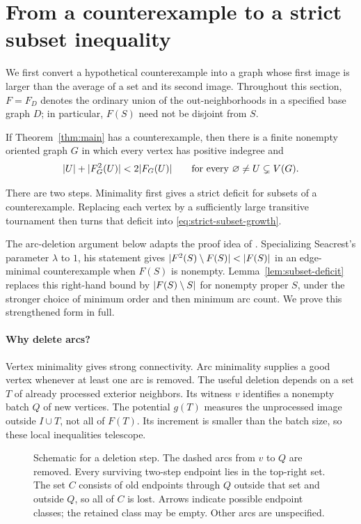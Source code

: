 \section{From a counterexample to a strict subset inequality}
\label{sec:reduction}

We first convert a hypothetical counterexample into a graph whose first
image is larger than the average of a set and its second image.  Throughout
this section, $F=F_D$ denotes the ordinary union of the out-neighborhoods
in a specified base graph $D$; in particular, $F(S)$ need not be disjoint
from $S$.

\begin{proposition}
\label{prop:counterexample-reduction}
If Theorem~\ref{thm:main} has a counterexample, then there is a finite
nonempty oriented graph $G$ in which every vertex has positive indegree
and
\begin{equation}
\label{eq:strict-subset-growth}
  \lvert U\rvert+\lvert F_G^2(U)\rvert<2\lvert F_G(U)\rvert
  \qquad\text{for every }\varnothing\ne U\subsetneq V(G).
\end{equation}
\end{proposition}

There are two steps.  Minimality first gives a strict deficit for subsets
of a counterexample.  Replacing each vertex by a sufficiently large
transitive tournament then turns that deficit into
\eqref{eq:strict-subset-growth}.

The arc-deletion argument below adapts the proof idea of
\cite[Lemma~4]{Seacrest2019}.  Specializing Seacrest's parameter $\lambda$
to $1$, his statement gives
$\lvert F^2(S)\setminus F(S)\rvert<\lvert F(S)\rvert$ in an edge-minimal
counterexample when $F(S)$ is nonempty.  Lemma~\ref{lem:subset-deficit}
replaces this right-hand bound by $\lvert F(S)\setminus S\rvert$ for nonempty
proper $S$, under the stronger choice of minimum order and then minimum
arc count.  We prove this strengthened form in full.


\paragraph{Why delete arcs?}
Vertex minimality gives strong connectivity. Arc minimality supplies a good
vertex whenever at least one arc is removed. The useful deletion depends on
a set $T$ of already processed exterior neighbors. Its witness $v$ identifies
a nonempty batch $Q$ of new vertices. The potential $g(T)$ measures the
unprocessed image outside $I\cup T$, not all of $F(T)$. Its increment is
smaller than the batch size, so these local inequalities telescope.
\begin{figure}[ht]\centering
\caption{Schematic for a deletion step. The dashed arcs from $v$ to $Q$ are removed. Every surviving two-step endpoint lies in the top-right set. The set $C$ consists of old endpoints through $Q$ outside that set and outside $Q$, so all of $C$ is lost. Arrows indicate possible endpoint classes; the retained class may be empty. Other arcs are unspecified.}
\end{figure}

